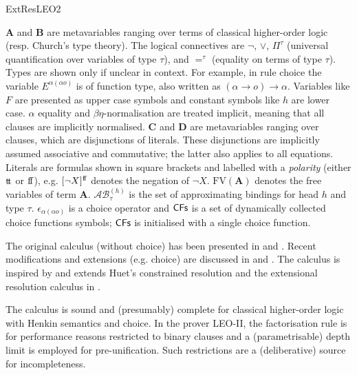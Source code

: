 \begin{entry}{ExtResLEO2}
 \begin{clarifications}
 $\mathbf{A}$ and $\mathbf{B}$ are metavariables ranging over terms of classical higher-order logic (resp. Church's type theory). The logical connectives are $\neg$, $\vee$, $\Pi^\tau$ (universal quantification over variables of type $\tau$), and $=^\tau$ (equality on terms of type $\tau$). Types are shown only if unclear in context. For example, in  rule choice the variable $E^{\alpha (\alpha o)}$ is of function type, also written as ${(\alpha \rightarrow o) \rightarrow \alpha}$. Variables like $F$ are presented as upper case symbols and constant symbols like $h$  are lower case. $\alpha$ equality and $\beta\eta$-normalisation are treated implicit, meaning that all clauses are implicitly normalised. $\mathbf{C}$ and $\mathbf{D}$ are metavariables ranging over clauses, which are disjunctions of literals. These disjunctions are implicitly assumed associative and commutative; the latter also applies to all equations. Literals are formulas shown in square brackets and labelled with a \emph{polarity} (either ${\mathrm{t}\!\mathrm{t}}$ or ${\mathrm{f}\!\mathrm{f}}$), e.g. $[\neg X]^{\mathrm{f}\!\mathrm{f}}$ denotes the negation of $\neg X$.  $\mathrm{FV}(\mathbf{A})$ denotes the free variables of term $\mathbf{A}$. $\mathcal{AB}^{(h)}_\tau$ is the set of approximating bindings for head $h$ and type $\tau$. $\epsilon_{\alpha (\alpha o)}$ is a choice operator and $\textsf{CFs}$ is a set of dynamically collected choice functions symbols; $\textsf{CFs}$ is initialised with a single choice function.
\end{clarifications}


 \begin{history}
The original calculus (without choice) has been presented in \cite{C5} and \cite{J5}. Recent modifications and extensions (e.g. choice) are discussed in  \cite{W47} and \cite{EasyChair:215}.
The calculus is inspired by and extends Huet's constrained resolution \cite{Huet:amott73,Huet:cracmfhol72} and the extensional resolution calculus in \cite{C2}.
 \end{history}

\begin{technicalities} 
The calculus is sound and (presumably) complete for classical higher-order logic with Henkin semantics and choice. In the prover LEO-II, the factorisation rule is for performance reasons restricted to binary clauses and a (parametrisable) depth limit is employed for pre-unification. Such restrictions are a (deliberative) source for incompleteness.
 \end{technicalities}



\end{entry}
